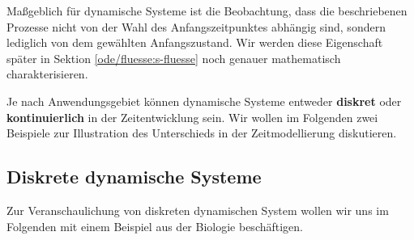 \documentclass[letterpaper,10pt,german]{jupyterBook}
\begin{document}
\par
Maßgeblich für dynamische Systeme ist die Beobachtung, dass die beschriebenen Prozesse nicht von der Wahl des Anfangszeitpunktes abhängig sind, sondern lediglich von dem gewählten Anfangszustand.
Wir werden diese Eigenschaft später in Sektion \cref{ode/fluesse:s-fluesse}  noch genauer mathematisch charakterisieren.

\par
Je nach Anwendungsgebiet können dynamische Systeme entweder \textbf{diskret} oder \textbf{kontinuierlich} in der Zeitentwicklung sein.
Wir wollen im Folgenden zwei Beispiele zur Illustration des Unterschieds in der Zeitmodellierung diskutieren.


\subsection{Diskrete dynamische Systeme}
\label{\detokenize{ode/dynamicSystems:diskrete-dynamische-systeme}}
\par
Zur Veranschaulichung von diskreten dynamischen System wollen wir uns im Folgenden mit einem Beispiel aus der Biologie beschäftigen.
\end{document}
